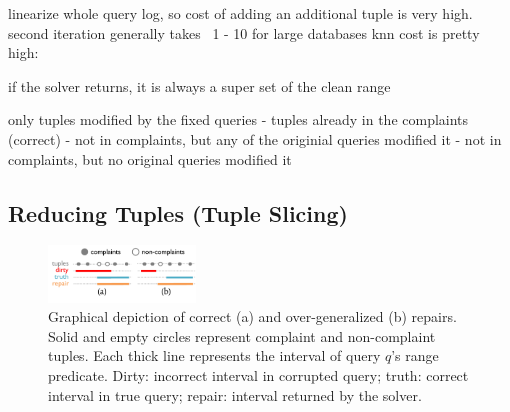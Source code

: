 linearize whole query log, so cost of adding an additional tuple is very high.
second iteration generally takes ~1 - 10%
for large databases knn cost is pretty high: ~

if the solver returns, it is always a super set of the clean range

only tuples modified by the fixed queries
- tuples already in the complaints (correct)
- not in complaints, but any of the originial queries modified it
- not in complaints, but no original queries modified it
\fi



\subsection{Reducing Tuples (Tuple Slicing)}
\label{sec:opt:tbsize}
\begin{figure}[t]
    \centering
    \includegraphics[width=0.35\textwidth]{figures/2nditerationgroups}
    \vspace*{-.2in}
    \caption{
      Graphical depiction of correct (a) and over-generalized (b) repairs.
      Solid and empty circles represent complaint and non-complaint tuples.
      Each thick line represents the interval of query $q$'s range predicate.
      Dirty: incorrect interval in corrupted query;
      truth: correct interval in true query;
      repair: interval returned by the solver.}
    \label{fig:groups}
    \vspace*{-.2in}
\end{figure}

